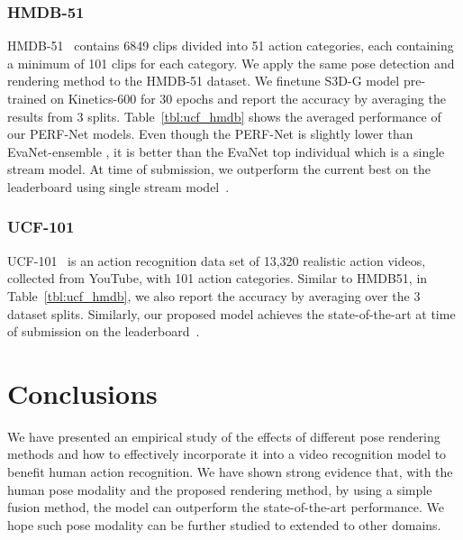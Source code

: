 \documentclass[letterpaper]{article} \usepackage{aaai21}  \usepackage{times}  \usepackage{helvet} \usepackage{courier}  \usepackage[hyphens]{url}  \usepackage{graphicx} \urlstyle{rm} \def\UrlFont{\rm}  \usepackage{natbib}  \usepackage{caption} \frenchspacing  \setlength{\pdfpagewidth}{8.5in}  \setlength{\pdfpageheight}{11in}
\begin{document}
\subsubsection{HMDB-51}
HMDB-51~\cite{hmdb51_paper} contains 6849 clips divided into 51 action categories, each containing a minimum of 101 clips for each category.
We apply the same pose detection and rendering method to the HMDB-51 dataset.
We finetune S3D-G model pre-trained on Kinetics-600 for 30 epochs and report the accuracy by averaging the results from  3 splits. 
Table~\ref{tbl:ucf_hmdb} shows the averaged performance of our PERF-Net models. Even though the PERF-Net is slightly lower than EvaNet-ensemble \cite{Piergiovanni_2019_ICCV}, it is better than the EvaNet top individual which is a single stream model. At time of submission, we outperform the current best on the leaderboard using single stream model~\cite{hmdb_leaderboard}.
















\subsubsection{UCF-101}
UCF-101~\cite{ucf101_paper} is an action recognition data set of 13,320 realistic action videos, collected from YouTube, with 101 action categories. Similar to HMDB51, in Table~\ref{tbl:ucf_hmdb}, we also report the accuracy by averaging over the 3 dataset splits. Similarly, our proposed model  achieves the state-of-the-art at time of submission on the  leaderboard~\cite{ucf_leaderboard}.























\section{Conclusions}
We have presented an empirical study of the effects of different pose rendering methods and how to effectively incorporate it into a video recognition model to benefit human action recognition. We have shown strong evidence that, with the human pose modality and the proposed rendering method, by using a simple fusion method, the model can outperform the state-of-the-art performance. We hope such pose modality can be further studied to extended to other domains.









\clearpage


\begin{quote}
\begin{small}

\end{small}
\end{quote}
\end{document}
